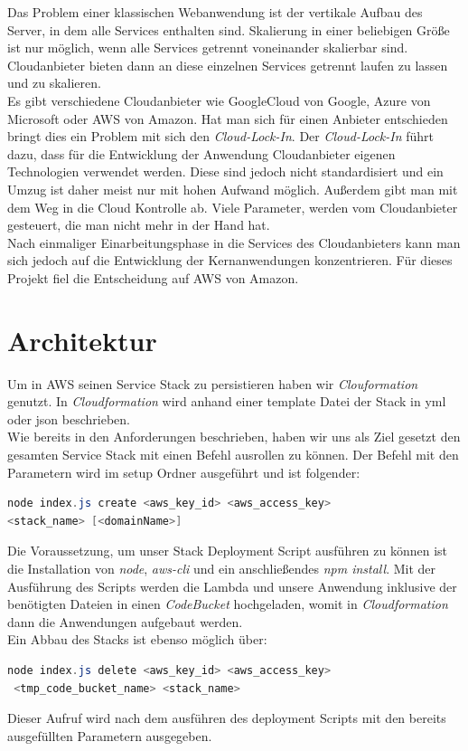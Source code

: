 \documentclass[a4paper, 12pt]{scrreprt}
\renewcommand\_{\textunderscore\allowbreak}
\begin{document}
Das Problem einer klassischen Webanwendung ist der vertikale Aufbau des Server, in dem alle Services enthalten sind. Skalierung in einer beliebigen Größe ist nur möglich, wenn alle Services getrennt voneinander skalierbar sind. Cloudanbieter bieten dann an diese einzelnen Services getrennt laufen zu lassen und zu skalieren. \\
Es gibt verschiedene Cloudanbieter wie GoogleCloud von Google, Azure von Microsoft oder AWS von Amazon. Hat man sich für einen Anbieter entschieden bringt dies ein Problem mit sich den \textit{Cloud-Lock-In}. Der \textit{Cloud-Lock-In} führt dazu, dass für die Entwicklung der Anwendung Cloudanbieter eigenen Technologien verwendet werden. Diese sind jedoch nicht standardisiert und ein Umzug ist daher meist nur mit hohen Aufwand möglich. Außerdem gibt man mit dem Weg in die Cloud Kontrolle ab. Viele Parameter, werden vom Cloudanbieter gesteuert, die man nicht mehr in der Hand hat.\\
Nach einmaliger Einarbeitungsphase in die Services des Cloudanbieters kann man sich jedoch auf die Entwicklung der Kernanwendungen konzentrieren. 
Für dieses Projekt fiel die Entscheidung auf AWS von Amazon.

\chapter{Architektur}
Um in AWS seinen Service Stack zu persistieren haben wir \textit{Clouformation} genutzt. In \textit{Cloudformation} wird anhand einer template Datei der Stack in yml oder json beschrieben. \\
Wie bereits in den Anforderungen beschrieben, haben wir uns als Ziel gesetzt den gesamten Service Stack mit einen Befehl ausrollen zu können. Der Befehl mit den Parametern wird im setup Ordner ausgeführt und ist folgender:

\bigskip
\begin{lstlisting}[xleftmargin=\parindent,frame=L,mathescape=true, basicstyle=\small, language=Java, lineskip={1.0pt}]
node index.js create <aws_key_id> <aws_access_key> 
<stack_name> [<domainName>]
\end{lstlisting}
\bigskip

\noindent Die Voraussetzung, um unser Stack Deployment Script ausführen zu können ist die Installation von \textit{node}, \textit{aws-cli} und ein anschließendes \textit{npm install}.
Mit der Ausführung des Scripts werden die Lambda und unsere Anwendung inklusive der benötigten Dateien in einen \textit{CodeBucket} hochgeladen, womit in \textit{Cloudformation} dann die Anwendungen aufgebaut werden.\\ Ein Abbau des Stacks ist ebenso möglich über:
\bigskip
\begin{lstlisting}[xleftmargin=\parindent,frame=L,mathescape=true, basicstyle=\small, language=Java, lineskip={1.0pt}]
node index.js delete <aws_key_id> <aws_access_key>
 <tmp_code_bucket_name> <stack_name>
\end{lstlisting}
\bigskip
Dieser Aufruf wird nach dem ausführen des deployment Scripts mit den bereits ausgefüllten Parametern ausgegeben.\\
\end{document}
